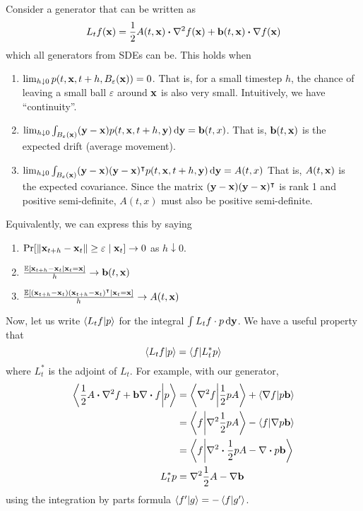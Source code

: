 \documentclass[notes]{agony}
\newcommand{\E}{\mathbb{E}}
\newcommand{\x}{\vb{x}}
\newcommand{\y}{\vb{y}}
\begin{document}
Consider a generator that can be written as
\[ L_t f(\x) = \frac12 A(t,\x) \vdot \nabla^2 f(\x) + \vb b(t,\x) \vdot\nabla f(\x) \]
which all generators from SDEs can be.
This holds when
\begin{enumerate}
	\item $\lim_{h\downarrow 0} p(t,\x,t+h,B_{\varepsilon}(\x)) = 0$.
	      That is, for a small timestep $h$, the chance of leaving a small ball $\varepsilon$
	      around $\x$ is also very small.
	      Intuitively, we have ``continuity''.
	\item $\lim_{h\downarrow 0} \int_{B_\varepsilon(\x)} (\y-\x)p(t,\x,t+h,\y)\dd{\y} = \vb b(t,x)$.
	      That is, $\vb b(t,\x)$ is the expected drift (average movement).
	\item $\lim_{h\downarrow 0} \int_{B_\varepsilon(\x)} (\y-\x)(\y-\x)\trans p(t,\x,t+h,\y)\dd{\y} = A(t,x)$
	      That is, $A(t,\x)$ is the expected covariance.
	      Since the matrix $(\y-\x)(\y-\x)\trans$ is rank 1 and positive semi-definite,
	      $A(t,x)$ must also be positive semi-definite.
\end{enumerate}
Equivalently, we can express this by saying
\begin{enumerate}
	\item $\Pr[\norm{\x_{t+h}-\x_t} \geq \varepsilon \mid \x_t] \to 0$ as $h \downarrow 0$.
	\item $\frac{\E[\x_{t+h}-\x_t \mid \x_t = \x]}{h} \to \vb b(t,\x)$
	\item $\frac{\E[(\x_{t+h}-\x_t)(\x_{t+h}-\x_t)\trans \mid \x_t = \x]}{h} \to A(t,\x)$
\end{enumerate}
Now, let us write $\ip{L_t f}{p}$ for the integral $\int L_t f\cdot p \dd{\y}$.
We have a useful property that
\[ \ip{L_t f}{p} = \ip{f}{L_t^* p} \]
where $L_t^*$ is the adjoint of $L_t$.
For example, with our generator,
\begin{align*}
	\ip{\frac12 A \vdot \nabla^2 f + \vb b \nabla \vdot f}{p}
	       & = \ip{\nabla^2 f}{\frac12pA} + \ip{\nabla f}{p\vb b}        \\
	       & = \ip{f}{\nabla^2 \frac12 p A} - \ip{f}{\nabla p \vb b}     \\
	       & = \ip{f}{\nabla^2 \vdot \frac12 p A - \nabla \vdot p \vb b} \\
	L_t^*p & = \nabla^2 \frac12 A - \nabla \vb b
\end{align*}
using the integration by parts formula $\ip{f'}{g} = -\ip{f}{g'}$.
\end{document}
